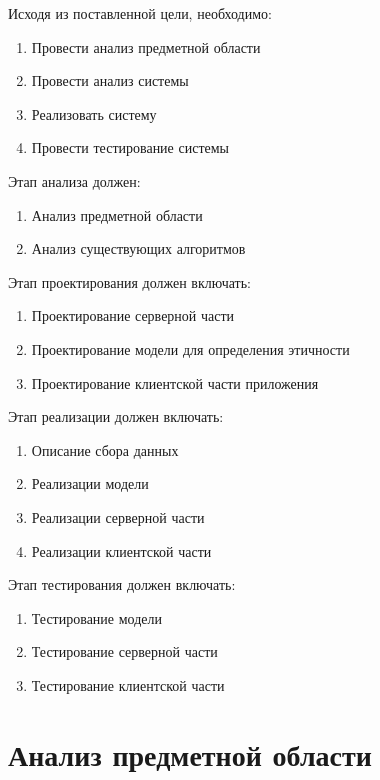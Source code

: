 \documentclass[PI, VKR]{HSEUniversity}
\begin{document}
Исходя из поставленной цели, необходимо:

\begin{enumerate}
\item Провести анализ предметной области
\item Провести анализ системы
\item Реализовать систему
\item Провести тестирование системы
\end{enumerate}

Этап анализа должен:
\begin{enumerate}
\item Анализ предметной области
\item Анализ существующих алгоритмов
\end{enumerate}

Этап проектирования должен включать:
\begin{enumerate}
\item Проектирование серверной части
\item Проектирование модели для определения этичности
\item Проектирование клиентской части приложения
\end{enumerate}

Этап реализации должен включать:
\begin{enumerate}
\item Описание сбора данных
\item Реализации модели
\item Реализации серверной части
\item Реализации клиентской части
\end{enumerate}

Этап тестирования должен включать:
\begin{enumerate}
\item Тестирование модели
\item Тестирование серверной части
\item Тестирование клиентской части
\end{enumerate}
\chapter{Анализ предметной области}
\label{sec:org2fe8004}
\end{document}
